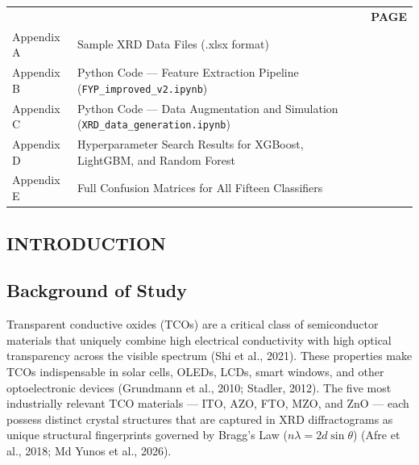 \documentclass[12pt, oneside]{article} %
\begin{document}
\noindent
\begin{tabular}{>{\raggedright\arraybackslash}p{2.6cm}  >{\raggedright\arraybackslash}p{9.9cm}  >{\raggedleft\arraybackslash}p{1.4cm}}
  &  & \textbf{PAGE} \\[2mm]
Appendix A & Sample XRD Data Files (.xlsx format) & \pageref{app:A} \\
Appendix B & Python Code --- Feature Extraction Pipeline (\texttt{FYP\_improved\_v2.ipynb}) & \pageref{app:B} \\
Appendix C & Python Code --- Data Augmentation and Simulation (\texttt{XRD\_data\_generation.ipynb}) & \pageref{app:C} \\
Appendix D & Hyperparameter Search Results for XGBoost, LightGBM, and Random Forest & \pageref{app:D} \\
Appendix E & Full Confusion Matrices for All Fifteen Classifiers & \pageref{app:E} \\
\end{tabular}



\vfill \null


\clearpage
{}
\setcounter{page}{1}

\setlength{\parindent}{30pt}



\vfill \null
\thispagestyle{empty}
\begin{center}
\section{INTRODUCTION}
\end{center}
\vspace{2cm}


\subsection{Background of Study}

Transparent conductive oxides (TCOs) are a critical class of semiconductor materials that uniquely combine high electrical conductivity with high optical transparency across the visible spectrum (Shi et al., 2021). These properties make TCOs indispensable in solar cells, OLEDs, LCDs, smart windows, and other optoelectronic devices (Grundmann et al., 2010; Stadler, 2012). The five most industrially relevant TCO materials --- ITO, AZO, FTO, MZO, and ZnO --- each possess distinct crystal structures that are captured in XRD diffractograms as unique structural fingerprints governed by Bragg's Law ($n\lambda = 2d\sin\theta$) (Afre et al., 2018; Md Yunos et al., 2026).
\end{document}
